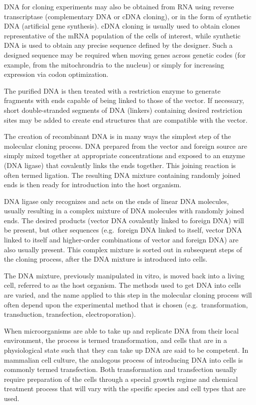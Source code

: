 DNA for cloning experiments may also be obtained from RNA using reverse transcriptase (complementary DNA or cDNA cloning), or in the form of synthetic DNA (artificial gene synthesis). cDNA cloning is usually used to obtain clones representative of the mRNA population of the cells of interest, while synthetic DNA is used to obtain any precise sequence defined by the designer. Such a designed sequence may be required when moving genes across genetic codes (for example, from the mitochrondria to the nucleus) or simply for increasing expression via codon optimization.

The purified DNA is then treated with a restriction enzyme to generate fragments with ends capable of being linked to those of the vector. If necessary, short double-stranded segments of DNA (linkers) containing desired restriction sites may be added to create end structures that are compatible with the vector.

The creation of recombinant DNA is in many ways the simplest step of the molecular cloning process. DNA prepared from the vector and foreign source are simply mixed together at appropriate concentrations and exposed to an enzyme (DNA ligase) that covalently links the ends together. This joining reaction is often termed ligation. The resulting DNA mixture containing randomly joined ends is then ready for introduction into the host organism.

DNA ligase only recognizes and acts on the ends of linear DNA molecules, usually resulting in a complex mixture of DNA molecules with randomly joined ends. The desired products (vector DNA covalently linked to foreign DNA) will be present, but other sequences (e.g.~foreign DNA linked to itself, vector DNA linked to itself and higher-order combinations of vector and foreign DNA) are also usually present. This complex mixture is sorted out in subsequent steps of the cloning process, after the DNA mixture is introduced into cells.

The DNA mixture, previously manipulated in vitro, is moved back into a living cell, referred to as the host organism. The methods used to get DNA into cells are varied, and the name applied to this step in the molecular cloning process will often depend upon the experimental method that is chosen (e.g.~transformation, transduction, transfection, electroporation).

When microorganisms are able to take up and replicate DNA from their local environment, the process is termed transformation, and cells that are in a physiological state such that they can take up DNA are said to be competent. In mammalian cell culture, the analogous process of introducing DNA into cells is commonly termed transfection. Both transformation and transfection usually require preparation of the cells through a special growth regime and chemical treatment process that will vary with the specific species and cell types that are used.

